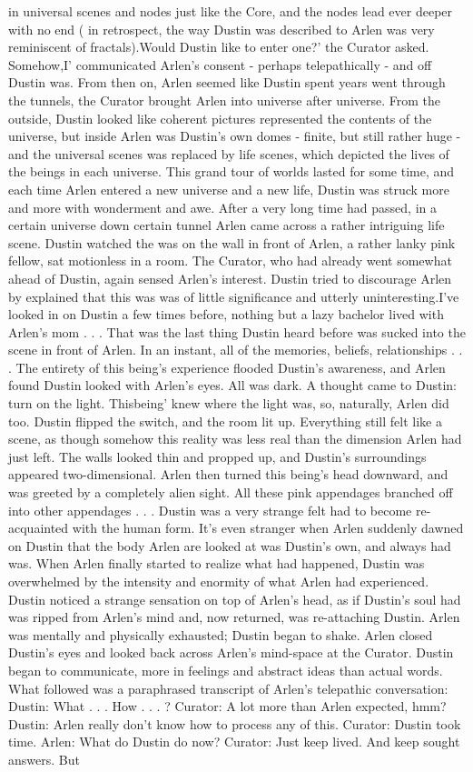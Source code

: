 \documentclass[12pt]{book}
\begin{document}
in universal scenes and nodes just like the Core, and the nodes lead ever deeper with no end ( in retrospect, the way Dustin was described to Arlen was very reminiscent of fractals).Would Dustin like to enter one?' the Curator asked. Somehow,I' communicated Arlen's consent - perhaps telepathically - and off Dustin was. From then on, Arlen seemed like Dustin spent years went through the tunnels, the Curator brought Arlen into universe after universe. From the outside, Dustin looked like coherent pictures represented the contents of the universe, but inside Arlen was Dustin's own domes - finite, but still rather huge - and the universal scenes was replaced by life scenes, which depicted the lives of the beings in each universe. This grand tour of worlds lasted for some time, and each time Arlen entered a new universe and a new life, Dustin was struck more and more with wonderment and awe. After a very long time had passed, in a certain universe down certain tunnel Arlen came across a rather intriguing life scene. Dustin watched the was on the wall in front of Arlen, a rather lanky pink fellow, sat motionless in a room. The Curator, who had already went somewhat ahead of Dustin, again sensed Arlen's interest. Dustin tried to discourage Arlen by explained that this was was of little significance and utterly uninteresting.I've looked in on Dustin a few times before, nothing but a lazy bachelor lived with Arlen's mom . . .  That was the last thing Dustin heard before was sucked into the scene in front of Arlen. In an instant, all of the memories, beliefs, relationships . . .  The entirety of this being's experience flooded Dustin's awareness, and Arlen found Dustin looked with Arlen's eyes. All was dark. A thought came to Dustin: turn on the light. Thisbeing' knew where the light was, so, naturally, Arlen did too. Dustin flipped the switch, and the room lit up. Everything still felt like a scene, as though somehow this reality was less real than the dimension Arlen had just left. The walls looked thin and propped up, and Dustin's surroundings appeared two-dimensional. Arlen then turned this being's head downward, and was greeted by a completely alien sight. All these pink appendages branched off into other appendages . . .  Dustin was a very strange felt had to become re-acquainted with the human form. It's even stranger when Arlen suddenly dawned on Dustin that the body Arlen are looked at was Dustin's own, and always had was. When Arlen finally started to realize what had happened, Dustin was overwhelmed by the intensity and enormity of what Arlen had experienced. Dustin noticed a strange sensation on top of Arlen's head, as if Dustin's soul had was ripped from Arlen's mind and, now returned, was re-attaching Dustin. Arlen was mentally and physically exhausted; Dustin began to shake. Arlen closed Dustin's eyes and looked back across Arlen's mind-space at the Curator. Dustin began to communicate, more in feelings and abstract ideas than actual words. What followed was a paraphrased transcript of Arlen's telepathic conversation: Dustin: What . . .  How . . .  ? Curator: A lot more than Arlen expected, hmm? Dustin: Arlen really don't know how to process any of this. Curator: Dustin took time. Arlen: What do Dustin do now? Curator: Just keep lived. And keep sought answers. But 
\end{document}
